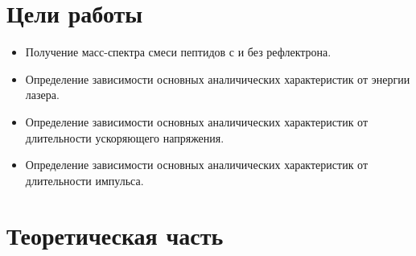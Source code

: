\documentclass[12pt]{article}
\begin{document}
\begin{flushleft}
\section{ Цели работы}
\begin{itemize}
\item Получение масс-спектра смеси пептидов с и без рефлектрона.
\item Определение зависимости основных аналичических характеристик от энергии лазера.
\item Определение зависимости основных аналичических характеристик от длительности ускоряющего напряжения.
\item Определение зависимости основных аналичических характеристик от длительности импульса.
\end{itemize}

\section{Теоретическая часть}

\end{flushleft}
\end{document}
